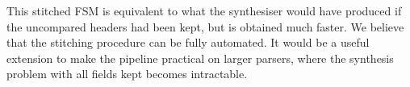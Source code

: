 This stitched FSM is equivalent to what the synthesiser
would have produced if the uncompared headers had been kept, but
is obtained much faster. We believe that the stitching procedure
can be fully automated. It would be a useful extension to make the
pipeline practical on larger parsers, where the synthesis problem
with all fields kept becomes intractable.

